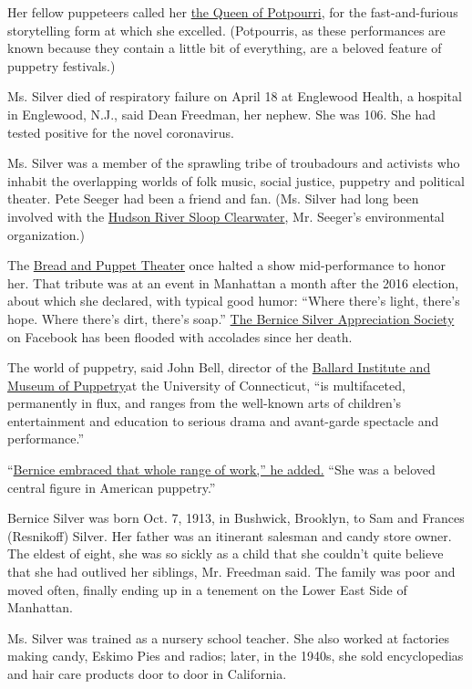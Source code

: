 Her fellow puppeteers called her
\href{https://www.youtube.com/watch?v=muhRXY_1IPI}{the Queen of
Potpourri}, for the fast-and-furious storytelling form at which she
excelled. (Potpourris, as these performances are known because they
contain a little bit of everything, are a beloved feature of puppetry
festivals.)

Ms. Silver died of respiratory failure on April 18 at Englewood Health,
a hospital in Englewood, N.J., said Dean Freedman, her nephew. She was
106. She had tested positive for the novel coronavirus.

Ms. Silver was a member of the sprawling tribe of troubadours and
activists who inhabit the overlapping worlds of folk music, social
justice, puppetry and political theater. Pete Seeger had been a friend
and fan. (Ms. Silver had long been involved with the
\href{https://www.clearwater.org/}{Hudson River Sloop Clearwater}, Mr.
Seeger's environmental organization.)

The \href{https://breadandpuppet.org}{Bread and Puppet Theater} once
halted a show mid-performance to honor her. That tribute was at an event
in Manhattan a month after the 2016 election, about which she declared,
with typical good humor: ``Where there's light, there's hope. Where
there's dirt, there's soap.''
\href{https://www.facebookcorewwwi.onion/groups/178715305925/}{The
Bernice Silver Appreciation Society} on Facebook has been flooded with
accolades since her death.

The world of puppetry, said John Bell, director of the
\href{https://bimp.uconn.edu}{Ballard Institute and Museum of
Puppetry}at the University of Connecticut, ``is multifaceted,
permanently in flux, and ranges from the well-known arts of children's
entertainment and education to serious drama and avant-garde spectacle
and performance.''

``\href{http://puppetvision.blog/2014/10/happy-101st-birthday-bernice-silver/}{Bernice
embraced that whole range of work,'' he added.} ``She was a beloved
central figure in American puppetry.''

Bernice Silver was born Oct. 7, 1913, in Bushwick, Brooklyn, to Sam and
Frances (Resnikoff) Silver. Her father was an itinerant salesman and
candy store owner. The eldest of eight, she was so sickly as a child
that she couldn't quite believe that she had outlived her siblings, Mr.
Freedman said. The family was poor and moved often, finally ending up in
a tenement on the Lower East Side of Manhattan.

Ms. Silver was trained as a nursery school teacher. She also worked at
factories making candy, Eskimo Pies and radios; later, in the 1940s, she
sold encyclopedias and hair care products door to door in California.

